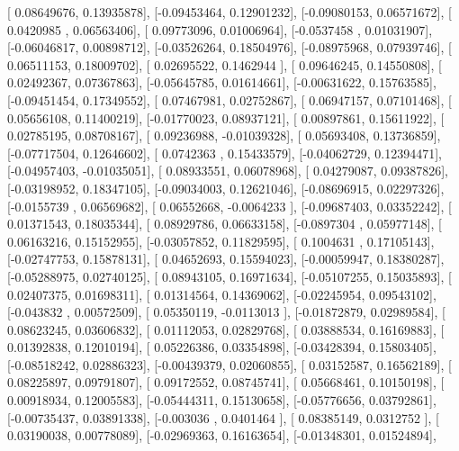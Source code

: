 \documentclass{article}
\begin{document}
       [ 0.08649676,  0.13935878],
       [-0.09453464,  0.12901232],
       [-0.09080153,  0.06571672],
       [ 0.0420985 ,  0.06563406],
       [ 0.09773096,  0.01006964],
       [-0.0537458 ,  0.01031907],
       [-0.06046817,  0.00898712],
       [-0.03526264,  0.18504976],
       [-0.08975968,  0.07939746],
       [ 0.06511153,  0.18009702],
       [ 0.02695522,  0.1462944 ],
       [ 0.09646245,  0.14550808],
       [ 0.02492367,  0.07367863],
       [-0.05645785,  0.01614661],
       [-0.00631622,  0.15763585],
       [-0.09451454,  0.17349552],
       [ 0.07467981,  0.02752867],
       [ 0.06947157,  0.07101468],
       [ 0.05656108,  0.11400219],
       [-0.01770023,  0.08937121],
       [ 0.00897861,  0.15611922],
       [ 0.02785195,  0.08708167],
       [ 0.09236988, -0.01039328],
       [ 0.05693408,  0.13736859],
       [-0.07717504,  0.12646602],
       [ 0.0742363 ,  0.15433579],
       [-0.04062729,  0.12394471],
       [-0.04957403, -0.01035051],
       [ 0.08933551,  0.06078968],
       [ 0.04279087,  0.09387826],
       [-0.03198952,  0.18347105],
       [-0.09034003,  0.12621046],
       [-0.08696915,  0.02297326],
       [-0.0155739 ,  0.06569682],
       [ 0.06552668, -0.0064233 ],
       [-0.09687403,  0.03352242],
       [ 0.01371543,  0.18035344],
       [ 0.08929786,  0.06633158],
       [-0.0897304 ,  0.05977148],
       [ 0.06163216,  0.15152955],
       [-0.03057852,  0.11829595],
       [ 0.1004631 ,  0.17105143],
       [-0.02747753,  0.15878131],
       [ 0.04652693,  0.15594023],
       [-0.00059947,  0.18380287],
       [-0.05288975,  0.02740125],
       [ 0.08943105,  0.16971634],
       [-0.05107255,  0.15035893],
       [ 0.02407375,  0.01698311],
       [ 0.01314564,  0.14369062],
       [-0.02245954,  0.09543102],
       [-0.043832  ,  0.00572509],
       [ 0.05350119, -0.0113013 ],
       [-0.01872879,  0.02989584],
       [ 0.08623245,  0.03606832],
       [ 0.01112053,  0.02829768],
       [ 0.03888534,  0.16169883],
       [ 0.01392838,  0.12010194],
       [ 0.05226386,  0.03354898],
       [-0.03428394,  0.15803405],
       [-0.08518242,  0.02886323],
       [-0.00439379,  0.02060855],
       [ 0.03152587,  0.16562189],
       [ 0.08225897,  0.09791807],
       [ 0.09172552,  0.08745741],
       [ 0.05668461,  0.10150198],
       [ 0.00918934,  0.12005583],
       [-0.05444311,  0.15130658],
       [-0.05776656,  0.03792861],
       [-0.00735437,  0.03891338],
       [-0.003036  ,  0.0401464 ],
       [ 0.08385149,  0.0312752 ],
       [ 0.03190038,  0.00778089],
       [-0.02969363,  0.16163654],
       [-0.01348301,  0.01524894],
\end{document}
